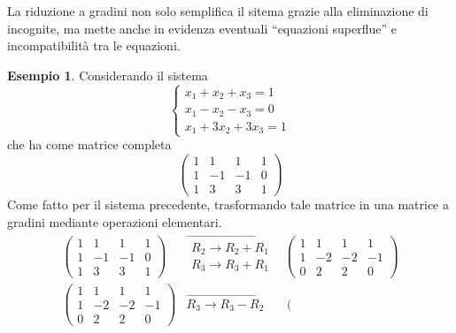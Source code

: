 \documentclass{book}
\theoremstyle{definition}
\newtheorem{es}{Esempio}[section]
\theoremstyle{plain}
\begin{document}
La riduzione a gradini non solo semplifica il sitema grazie alla
eliminazione di incognite, ma mette anche in evidenza eventuali
``equazioni superflue'' e incompatibilità tra le equazioni.
\begin{es}
  \label{es:gauss-jorda2}
  Considerando il sistema
  \begin{equation}
    \label{eq:gauss-jorda2-1}
    \begin{cases}
      x_1+x_2+x_3=1\\
      x_1-x_2-x_3=0\\
      x_1+3x_2+3x_3=1
    \end{cases}
  \end{equation}
  che ha come matrice completa
  \begin{equation}
    \label{eq:gauss-jorda2-2}
    \left(\begin{array}{ccc|c}
      1 & 1 & 1 & 1   \\
      1 & -1 & -1 & 0 \\
      1 & 3 & 3 & 1
    \end{array}\right)
  \end{equation}
  Come fatto per il sistema precedente, trasformando tale matrice in una
  matrice a gradini mediante operazioni elementari.
  \begin{eqnarray*}
    \left(\begin{array}{ccc|c}
      1 & 1 & 1 & 1   \\
      1 & -1 & -1 & 0 \\
      1 & 3 & 3 & 1
    \end{array}\right)& \overrightarrow{
        \begin{matrix}
          R_2\to R_2+R_1\\
          R_3\to R_3+R_1
        \end{matrix}
      }& \left(\begin{array}{ccc|c}
        1 & 1 & 1 & 1   \\
        1 & -2 & -2 & -1 \\
        0 & 2 & 2 & 0
      \end{array}\right)\\
    \left(\begin{array}{ccc|c}
        1 & 1 & 1 & 1   \\
        1 & -2 & -2 & -1 \\
        0 & 2 & 2 & 0
      \end{array}\right) & \overrightarrow{
                             R_3\to R_3-R_2} &
                              \left(\begin{array}{ccc|c}

\end{array}
\end{eqnarray*}
\end{es}
\end{document}
